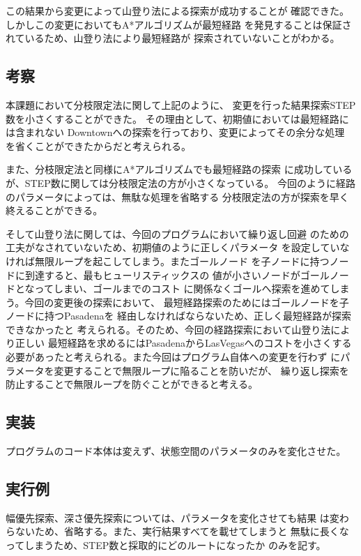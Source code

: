 \documentclass{jarticle}
\begin{document}
この結果から変更によって山登り法による探索が成功することが
確認できた。しかしこの変更においてもA*アルゴリズムが最短経路
を発見することは保証されているため、山登り法により最短経路が
探索されていないことがわかる。
\subsection{考察}

本課題において分枝限定法に関して上記のように、
変更を行った結果探索STEP数を小さくすることができた。
その理由として、初期値においては最短経路には含まれない
Downtownへの探索を行っており、変更によってその余分な処理
を省くことができたからだと考えられる。

また、分枝限定法と同様にA*アルゴリズムでも最短経路の探索
に成功しているが、STEP数に関しては分枝限定法の方が小さくなっている。
今回のように経路のパラメータによっては、無駄な処理を省略する
分枝限定法の方が探索を早く終えることができる。

そして山登り法に関しては、今回のプログラムにおいて繰り返し回避
のための工夫がなされていないため、初期値のように正しくパラメータ
を設定していなければ無限ループを起こしてしまう。またゴールノード
を子ノードに持つノードに到達すると、最もヒューリスティックスの
値が小さいノードがゴールノードとなってしまい、ゴールまでのコスト
に関係なくゴールへ探索を進めてしまう。今回の変更後の探索において、
最短経路探索のためにはゴールノードを子ノードに持つPasadenaを
経由しなければならないため、正しく最短経路が探索できなかったと
考えられる。そのため、今回の経路探索において山登り法により正しい
最短経路を求めるにはPasadenaからLasVegasへのコストを小さくする
必要があったと考えられる。また今回はプログラム自体への変更を行わず
にパラメータを変更することで無限ループに陥ることを防いだが、
繰り返し探索を防止することで無限ループを防ぐことができると考える。

\subsection{実装}
プログラムのコード本体は変えず、状態空間のパラメータのみを変化させた。

\subsection{実行例}
幅優先探索、深さ優先探索については、パラメータを変化させても結果
は変わらないため、省略する。また、実行結果すべてを載せてしまうと
無駄に長くなってしまうため、STEP数と採取的にどのルートになったか
のみを記す。
\end{document}

